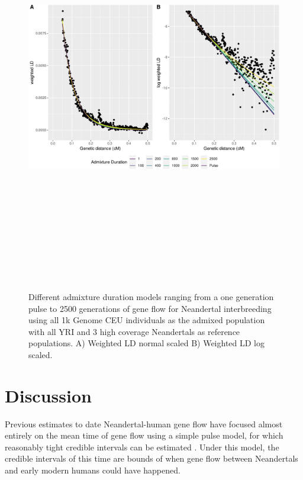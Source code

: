 \documentclass[11pt]{article}
\begin{document}
\begin{figure}
\centering
\includegraphics[width=16cm,height=18cm,keepaspectratio]{Admixture_Time_Inference_Paper_Draft_files/figure-latex/fig5-1.pdf}
\caption{\label{fig:fig5} Different admixture duration models ranging
from a one generation pulse to 2500 generations of gene flow for Neandertal interbreeding using all 1k Genome CEU individuals as the admixed population
with all YRI and 3 high coverage Neandertals as reference populations. A) Weighted LD normal scaled B) Weighted LD log scaled.}
\end{figure}

\section{Discussion}\label{discussion}
Previous estimates to date Neandertal-human gene flow have focused almost entirely on the mean time of gene flow using a simple pulse model, for which reasonably tight credible intervals can be estimated \citep{sankararaman_date_2012, moorjani_genetic_2016}. Under this model, the credible intervals of this time are bounds of when gene flow between Neandertals and early modern humans could have happened.
\end{document}
